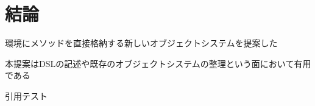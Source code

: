 \documentclass{ipsjprosym}
\begin{document}
\section{結論}

環境にメソッドを直接格納する新しいオブジェクトシステムを提案した

本提案はDSLの記述や既存のオブジェクトシステムの整理という面において有用である

引用テスト





\end{document}
